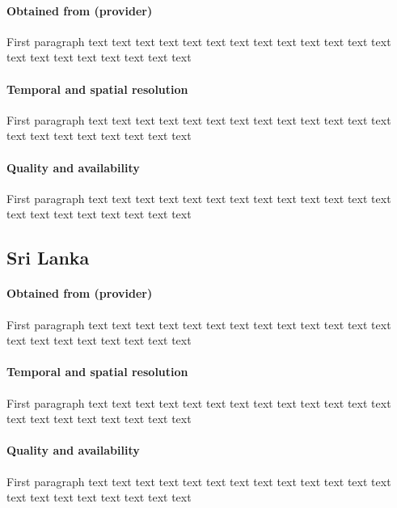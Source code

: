 \documentclass[twocolumn, 10pt, a4paper]{memoir}
\begin{document}
		\paragraph{Obtained from (provider)}
		First paragraph 
		text text text text text text text text text text text text text text text text text text text text text
		\paragraph{Temporal and spatial resolution}
		First paragraph 
		text text text text text text text text text text text text text text text text text text text text text
		\paragraph{Quality and availability}
		First paragraph 
		text text text text text text text text text text text text text text text text text text text text text
	\subsection{Sri Lanka}
		\paragraph{Obtained from (provider)}
		First paragraph 
		text text text text text text text text text text text text text text text text text text text text text
		\paragraph{Temporal and spatial resolution}
		First paragraph 
		text text text text text text text text text text text text text text text text text text text text text
		\paragraph{Quality and availability}
		First paragraph 
		text text text text text text text text text text text text text text text text text text text text text
\end{document}
